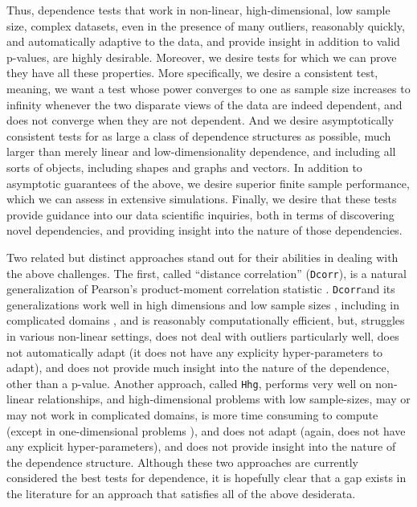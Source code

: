 \documentclass[11pt]{article}
\providecommand{\sct}[1]{{\sc \texttt{#1}}}
\newcommand{\Hhg}{\sct{Hhg}}
\newcommand{\Dcorr}{\sct{Dcorr}}
\begin{document}
Thus, dependence tests that work in non-linear, high-dimensional, low sample size, complex datasets, even in the presence of many outliers, reasonably quickly, and automatically adaptive to the data, and provide insight in addition to valid p-values, are highly desirable. Moreover, we desire tests for which we can prove they have all these properties. More specifically, we desire a consistent test, meaning, we want a test whose power converges to one as sample size increases to infinity whenever the two disparate views of the data are indeed dependent, and does not converge when they are not dependent. And we desire asymptotically consistent tests for as large a class of dependence structures as possible, much larger than merely linear and low-dimensionality dependence, and including all sorts of objects, including shapes and graphs and vectors.  In addition to asymptotic guarantees of the above, we desire superior finite sample performance, which we can assess in extensive simulations.  Finally, we desire that these tests provide guidance into our data scientific inquiries, both in terms of discovering novel dependencies, and providing insight into the nature of those dependencies.  




Two related but distinct approaches stand out for their abilities in dealing with the above challenges. The first, called ``distance correlation'' (\Dcorr), is a natural generalization of Pearson's product-moment correlation statistic \cite{RizzoSzekely2016}.  \Dcorr and its generalizations work well in high dimensions and low sample sizes \cite{??}, including in complicated domains \cite{Lyons2013}, and is reasonably computationally efficient, but, struggles in various non-linear settings, does not deal with outliers particularly well, does not automatically adapt (it does not have any explicity hyper-parameters to adapt), and does not provide much insight into the nature of the dependence, other than a p-value.  Another approach, called \Hhg \cite{HellerGorfine2013}, performs very well on non-linear relationships, and high-dimensional problems with low sample-sizes, may or may not work in complicated domains, is more time consuming to compute (except in one-dimensional problems \cite{??}), and does not adapt (again, does not have any explicit hyper-parameters), and does not provide insight into the nature of the dependence structure.  Although these two approaches are currently considered the best tests for dependence, it is hopefully clear that a gap exists in the literature for an approach that satisfies all of the above desiderata. 
\end{document}
